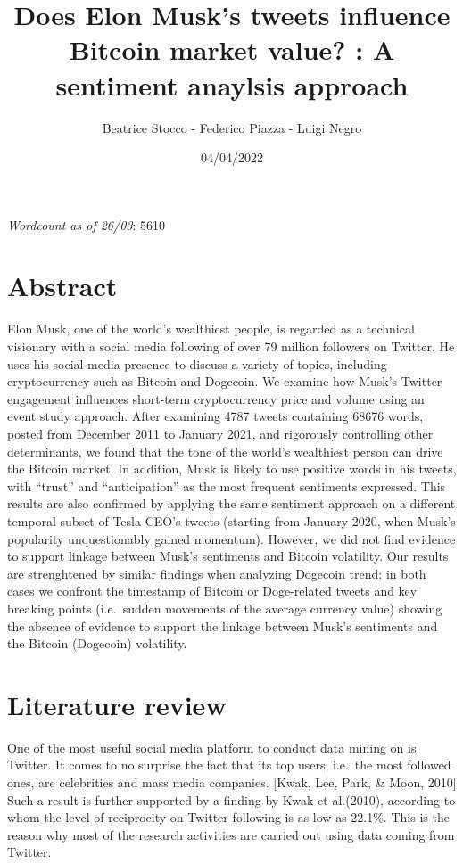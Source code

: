 \documentclass[
]{article}
\title{Does Elon Musk's tweets influence Bitcoin market value? : A
sentiment anaylsis approach}
\author{Beatrice Stocco - Federico Piazza - Luigi Negro}
\date{04/04/2022}
\begin{document}
\maketitle

\emph{Wordcount as of 26/03}: 5610

\hypertarget{abstract}{%
\section{Abstract}\label{abstract}}

Elon Musk, one of the world's wealthiest people, is regarded as a
technical visionary with a social media following of over 79 million
followers on Twitter. He uses his social media presence to discuss a
variety of topics, including cryptocurrency such as Bitcoin and
Dogecoin. We examine how Musk's Twitter engagement influences short-term
cryptocurrency price and volume using an event study approach. After
examining 4787 tweets containing 68676 words, posted from December 2011
to January 2021, and rigorously controlling other determinants, we found
that the tone of the world's wealthiest person can drive the Bitcoin
market. In addition, Musk is likely to use positive words in his tweets,
with ``trust'' and ``anticipation'' as the most frequent sentiments
expressed. This results are also confirmed by applying the same
sentiment approach on a different temporal subset of Tesla CEO's tweets
(starting from January 2020, when Musk's popularity unquestionably
gained momentum). However, we did not find evidence to support linkage
between Musk's sentiments and Bitcoin volatility. Our results are
strenghtened by similar findings when analyzing Dogecoin trend: in both
cases we confront the timestamp of Bitcoin or Doge-related tweets and
key breaking points (i.e.~sudden movements of the average currency
value) showing the absence of evidence to support the linkage between
Musk's sentiments and the Bitcoin (Dogecoin) volatility.

\hypertarget{literature-review}{%
\section{Literature review}\label{literature-review}}

One of the most useful social media platform to conduct data mining on
is Twitter. It comes to no surprise the fact that its top users,
i.e.~the most followed ones, are celebrities and mass media companies.
{[}Kwak, Lee, Park, \& Moon, 2010{]} Such a result is further supported
by a finding by Kwak et al.(2010), according to whom the level of
reciprocity on Twitter following is as low as 22.1\%. This is the reason
why most of the research activities are carried out using data coming
from Twitter.
\end{document}
